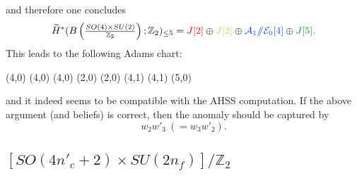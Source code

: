 \documentclass[12pt]{article}
\numberwithin{equation}{section}
\newcommand*{\colorA}[1]{\textcolor{colorA}{#1}}
\newcommand*{\colorB}[1]{\textcolor{colorB}{#1}}
\newcommand*{\colorC}[1]{\textcolor{colorC}{#1}}
\newcommand*{\colorD}[1]{\textcolor{colorD}{#1}}
\def\bZ{\mathbb{Z}}
\begin{document}
and therefore one concludes
\begin{equation}
	\widetilde H^\ast(B\left(\tfrac{SO(4)\times SU(2)}{\bZ_2}\right);\bZ_2)_{\leq 5} = \colorA{J[2]} \oplus \colorC{J[2]} \oplus \colorB{\mathcal{A}_1/\!\!/\mathcal{E}_0[4]} \oplus \colorD{J[5]}.
\end{equation}
This leads to the following Adams chart:
\begin{center}
	\begin{sseqdata}[
		name=M,
		Adams grading,
		classes = fill,
		xrange = {0}{5},
		yrange = {0}{3},
	]
		\tower[colorB](4,0)
		\class[white](4,0)
		\class[white](4,0)
		\class[colorA](2,0)
		\class[colorC](2,0)
		\tower[colorA](4,1)
		\tower[colorC](4,1)
		\class[colorD](5,0)
	\end{sseqdata}
	\printpage[name = M,page = 2]
\end{center}
and it indeed seems to be compatible with the AHSS computation.
If the above argument (and beliefs) is correct, then the anomaly should be captured by
\begin{equation}
	w_2w'_3\ (= w_3w'_2).
\end{equation}

\subsection{$[SO(4n'_c+2)\times SU(2n_f)]/\bZ_2$}
\label{sec:so(2odd)}
\end{document}
